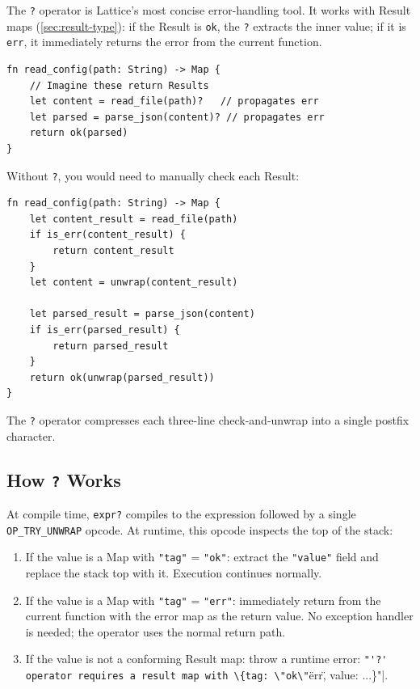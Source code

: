 The \lstinline|?| operator is Lattice's most concise error-handling tool. It works with Result maps (\cref{sec:result-type}): if the Result is \lstinline|ok|, the \lstinline|?| extracts the inner value; if it is \lstinline|err|, it immediately returns the error from the current function.

\begin{lstlisting}[language=Lattice, caption={The ? operator in action}]
fn read_config(path: String) -> Map {
    // Imagine these return Results
    let content = read_file(path)?   // propagates err
    let parsed = parse_json(content)? // propagates err
    return ok(parsed)
}
\end{lstlisting}

Without \lstinline|?|, you would need to manually check each Result:

\begin{lstlisting}[language=Lattice, caption={Manual error checking (the verbose way)}]
fn read_config(path: String) -> Map {
    let content_result = read_file(path)
    if is_err(content_result) {
        return content_result
    }
    let content = unwrap(content_result)

    let parsed_result = parse_json(content)
    if is_err(parsed_result) {
        return parsed_result
    }
    return ok(unwrap(parsed_result))
}
\end{lstlisting}

The \lstinline|?| operator compresses each three-line check-and-unwrap into a single postfix character.

\subsection{How \texttt{?} Works}\label{sec:question-mechanics}

At compile time, \lstinline|expr?| compiles to the expression followed by a single \lstinline|OP_TRY_UNWRAP| opcode. At runtime, this opcode inspects the top of the stack:

\begin{enumerate}
  \item If the value is a Map with \lstinline|"tag"| = \lstinline|"ok"|: extract the \lstinline|"value"| field and replace the stack top with it. Execution continues normally.
  \item If the value is a Map with \lstinline|"tag"| = \lstinline|"err"|: immediately return from the current function with the error map as the return value. No exception handler is needed; the operator uses the normal return path.
  \item If the value is not a conforming Result map: throw a runtime error: \lstinline|"'?' operator requires a result map with \{tag: \"ok\"|\"err\", value: ...\}"|.
\end{enumerate}

